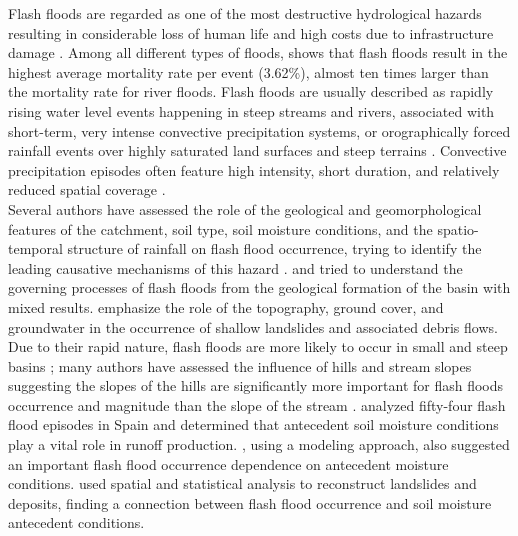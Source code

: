 \documentclass[hess, manuscript]{copernicus}
\begin{document}
\introduction  %

Flash floods are regarded as one of the most destructive hydrological hazards resulting in considerable loss of human life and high costs due to infrastructure damage  \citep{Roux2011, Gruntfest2001}.  Among all different types of floods,  \cite{Jonkman2005} shows that flash floods result in the highest average mortality rate per event (3.62\%), almost ten times larger than the mortality rate for river floods.  Flash floods are usually described as rapidly rising water level events happening in steep streams and rivers, associated with short-term, very intense convective precipitation systems, or orographically forced rainfall events over highly saturated land surfaces and steep terrains \citep{Salek2006, Llasat2016, Douinot2016}.  Convective precipitation episodes often feature high intensity, short duration, and relatively reduced spatial coverage \citep{HouzeMCS2004}.   \\

Several authors have assessed the role of the geological and geomorphological features of the catchment, soil type,  soil moisture conditions, and the spatio-temporal structure of rainfall on flash flood occurrence, trying to identify the leading causative mechanisms of this hazard \citep{Merz2003}.  \citet{Adamovic2016} and \citet{Vannier2016}  tried to understand the governing processes of flash floods from the geological formation of the basin with mixed results. \citet{Wu1995} emphasize the role of the topography, ground cover, and groundwater in the occurrence of shallow landslides and associated debris flows. Due to their rapid nature, flash floods are more likely to occur in small and steep basins \citep{Younis2008}; many authors have assessed the influence of hills and stream slopes suggesting the slopes of the hills are significantly more important for flash floods occurrence and magnitude than the slope of the stream  \citep{Salek2006, Roux2011, Yatheendradas2008}. \citet{Rodriguez2012}  analyzed fifty-four flash flood episodes in Spain and determined that antecedent soil moisture conditions play a vital role in runoff production.  \citet{Castillo2003}, using a modeling approach, also suggested an important flash flood occurrence dependence on antecedent moisture conditions. \citet{Aronica2012} used spatial and statistical analysis to reconstruct landslides and deposits, finding a connection between flash flood occurrence and soil moisture antecedent conditions.\\
\end{document}
